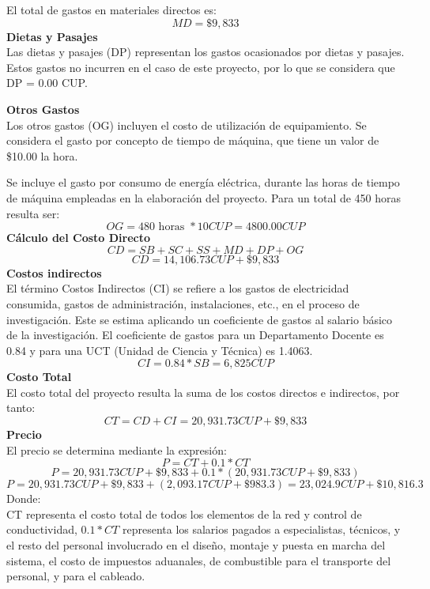 El total de gastos en materiales directos es:
\begin{equation}
    MD = \$9,833
\end{equation}
\textbf{Dietas y Pasajes}\\
Las dietas y pasajes (DP) representan los gastos ocasionados por dietas y pasajes. Estos gastos no incurren en el caso de este proyecto, por lo que se considera que DP = 0.00  CUP.

\textbf{Otros Gastos}\\
Los otros gastos (OG) incluyen el costo de utilización de equipamiento. Se considera el gasto por
concepto de tiempo de máquina, que tiene un valor de \$10.00 la hora.

Se incluye el gasto por consumo de energía eléctrica, durante las horas de tiempo de máquina empleadas
en la elaboración del proyecto. Para un total de 450 horas resulta ser:
\begin{equation}
    OG = 480 \text{ horas } * 10 CUP= 4800.00 CUP
\end{equation}
\textbf{Cálculo del Costo Directo}\\
\begin{equation}
    CD = SB + SC + SS + MD + DP + OG
\end{equation}
\begin{equation}
    CD = 14,106.73  CUP+ \$9,833
\end{equation}
\textbf{Costos indirectos}\\
El término Costos Indirectos (CI) se refiere a los gastos de electricidad consumida, gastos de administración,
instalaciones, etc., en el proceso de investigación. Este se estima aplicando un coeficiente de gastos al
salario básico de la investigación. El coeficiente de gastos para un Departamento Docente es 0.84 y para una
UCT (Unidad de Ciencia y Técnica) es 1.4063.
\begin{equation}
    CI = 0.84 * SB = 6,825  CUP
\end{equation}
\textbf{Costo Total}\\
El costo total del proyecto resulta la suma de los costos directos e indirectos, por tanto:
\begin{equation}
    CT = CD + CI = 20,931.73 CUP + \$9, 833
\end{equation}
\textbf{Precio}\\
El precio se determina mediante la expresión:
\begin{equation}
    P = CT + 0.1 * CT
\end{equation}
\begin{equation}
    P = 20,931.73 CUP + \$9, 833 + 0.1 * (20,931.73 CUP + \$9, 833)
\end{equation}
\begin{equation}
    P = 20,931.73 CUP + \$9, 833 +  (2,093.17 CUP + \$983.3) = 23,024.9 CUP + \$10,816.3
\end{equation}
Donde:\\
CT representa el costo total de todos los elementos de la red y control de conductividad, $0.1*CT$
representa los salarios pagados a especialistas, técnicos, y el resto del personal involucrado en el diseño,
montaje y puesta en marcha del sistema, el costo de impuestos aduanales, de combustible para el transporte del
personal, y para el cableado.

